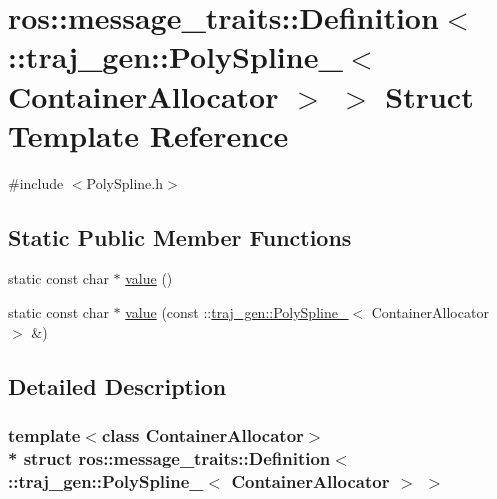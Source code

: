 \hypertarget{structros_1_1message__traits_1_1_definition_3_01_1_1traj__gen_1_1_poly_spline___3_01_container_allocator_01_4_01_4}{}\section{ros\+:\+:message\+\_\+traits\+:\+:Definition$<$ \+:\+:traj\+\_\+gen\+:\+:Poly\+Spline\+\_\+$<$ Container\+Allocator $>$ $>$ Struct Template Reference}
\label{structros_1_1message__traits_1_1_definition_3_01_1_1traj__gen_1_1_poly_spline___3_01_container_allocator_01_4_01_4}


{\ttfamily \#include $<$Poly\+Spline.\+h$>$}

\subsection*{Static Public Member Functions}
\begin{DoxyCompactItemize}
\item 
static const char $\ast$ \hyperlink{structros_1_1message__traits_1_1_definition_3_01_1_1traj__gen_1_1_poly_spline___3_01_container_allocator_01_4_01_4_a0c5fafecad695d157aaa8804953a6b60}{value} ()
\item 
static const char $\ast$ \hyperlink{structros_1_1message__traits_1_1_definition_3_01_1_1traj__gen_1_1_poly_spline___3_01_container_allocator_01_4_01_4_aa8f178e3072c77bc6465e3e4ea27476b}{value} (const \+::\hyperlink{structtraj__gen_1_1_poly_spline__}{traj\+\_\+gen\+::\+Poly\+Spline\+\_\+}$<$ Container\+Allocator $>$ \&)
\end{DoxyCompactItemize}


\subsection{Detailed Description}
\subsubsection*{template$<$class Container\+Allocator$>$\\*
struct ros\+::message\+\_\+traits\+::\+Definition$<$ \+::traj\+\_\+gen\+::\+Poly\+Spline\+\_\+$<$ Container\+Allocator $>$ $>$}



